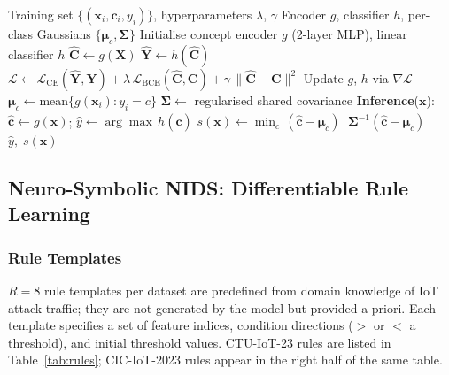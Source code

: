 \documentclass[conference]{IEEEtran}
\begin{document}
\begin{algorithm}[!ht]
\caption{CBM Training and OOD Scoring}
\label{alg:cbm}
\begin{algorithmic}[1]
\Require Training set $\{(\mathbf{x}_i, \mathbf{c}_i, y_i)\}$,
         hyperparameters $\lambda$, $\gamma$
\Ensure  Encoder $g$, classifier $h$,
         per-class Gaussians $\{\boldsymbol{\mu}_c, \boldsymbol{\Sigma}\}$
\State Initialise concept encoder $g$ (2-layer MLP), linear classifier $h$
    \State $\hat{\mathbf{C}} \gets g(\mathbf{X})$
    \State $\hat{\mathbf{Y}} \gets h(\hat{\mathbf{C}})$
    \State $\mathcal{L} \gets \mathcal{L}_{\mathrm{CE}}(\hat{\mathbf{Y}},\mathbf{Y})
             + \lambda\,\mathcal{L}_{\mathrm{BCE}}(\hat{\mathbf{C}},\mathbf{C})
             + \gamma\,\|\hat{\mathbf{C}}-\mathbf{C}\|^2$
    \State Update $g$, $h$ via $\nabla\mathcal{L}$
  \EndFor
\EndFor
{} 
  \State $\boldsymbol{\mu}_c \gets \mathrm{mean}\{g(\mathbf{x}_i) : y_i = c\}$
\EndFor
\State $\boldsymbol{\Sigma} \gets$ regularised shared covariance
\Statex
\Statex \textbf{Inference}($\mathbf{x}$):
\State $\hat{\mathbf{c}} \gets g(\mathbf{x})$;\quad
       $\hat{y} \gets \arg\max\, h(\hat{\mathbf{c}})$
\State $s(\mathbf{x}) \gets \min_c\,
       (\hat{\mathbf{c}}-\boldsymbol{\mu}_c)^\top
       \boldsymbol{\Sigma}^{-1}
       (\hat{\mathbf{c}}-\boldsymbol{\mu}_c)$
\State \Return $\hat{y},\; s(\mathbf{x})$
\end{algorithmic}
\end{algorithm}

\subsection{Neuro-Symbolic NIDS: Differentiable Rule Learning}
\label{sec:nesy}

\subsubsection{Rule Templates}

$R{=}8$ rule templates per dataset are predefined from domain knowledge
of IoT attack traffic; they are not generated by the model but provided
a priori. Each template specifies a set of feature indices, condition
directions ($>$ or $<$ a threshold), and initial threshold values.
CTU-IoT-23 rules are listed in Table~\ref{tab:rules}; CIC-IoT-2023
rules appear in the right half of the same table.
\end{document}
